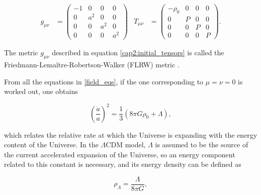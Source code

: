 \documentclass[openany,a4paper,12pt,oneside]{book}
\begin{document}
\begin{spacing}{1.5}
\begin{align}\label{cap2:initial_tensors}
    g_{\mu\nu}&=
    \begin{pmatrix}
        -1 & 0 & 0 & 0\\
        0 & a^2 & 0 & 0\\
        0 & 0 & a^2 & 0\\
        0 & 0 & 0 & a^2
    \end{pmatrix} &
    T_{\mu\nu}&=
    \begin{pmatrix}
        -\rho_0 & 0 & 0 & 0 \\
        0 & P & 0 & 0 \\
        0 & 0 & P & 0 \\
        0 & 0 & 0 & P
    \end{pmatrix}.
\end{align}

The metric $g_{\mu\nu}$ described in equation \eqref{cap2:initial_tensors} is called the Friedmann-Lemaître-Robertson-Walker (FLRW) metric \cite{FLRW_metric}. 



From all the equations in \eqref{field_eqs}, if the one corresponding to $\mu=\nu=0$ is worked out, one obtains

\begin{equation}\label{fried1_step1}
    \left(\frac{\dot{a}}{a}\right)^2=\frac{1}{3}\left(8\pi G\rho_0+\Lambda\right),
\end{equation}

\noindent which relates the relative rate at which the Universe is expanding with the energy content of the Universe. In the $\Lambda$CDM model, $\Lambda$ is assumed to be the source of the current accelerated expansion of the Universe, so an energy component related to this constant is necessary, and its energy density can be defined as

\begin{equation}\label{def:rho_lambda}
    \rho_\Lambda=\frac{\Lambda}{8\pi G},
\end{equation}


\end{spacing}
\end{document}
